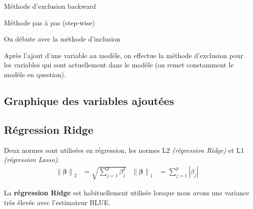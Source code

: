 \documentclass[10pt, french]{article}
\newcommand{\norm}[1]{\left\lVert#1\right\rVert}
\begin{document}
\begin{multicols*}{3}
\begin{enumerate}
\begin{algo}{Méthode d'exclusion backward}
\end{algo}
\end{enumerate}

\begin{enumerate}
\begin{algo}{Méthode pas à pas (step-wise)}

\item On débute avec la méthode d'inclusion
\item Après l'ajout d'une variable au modèle, on effectue la méthode d'exclusion pour les variables qui sont actuellement dans le modèle (on remet constamment le modèle en question).
\end{algo}
\end{enumerate}

%

\subsection*{Graphique des variables ajoutées}



\subsection*{Régression Ridge}

Deux normes sont utilisées en régression, les normes L2 \textit{(régression Ridge)} et L1 \textit{(régression Lasso)}. 
\begin{align*}
\norm{\bm{\beta}}_2 &= \sqrt{\sum_{j = 1}^{p} \beta_{j}^{2}} &
\norm{\bm{\beta}}_1 &= \sum_{j = 1}^{p} \left|\beta_{j} \right|
\end{align*}

La \textbf{régression Ridge} est habituellement utilisée lorsque nous avons une variance très élevée avec l'estimateur BLUE.


\end{multicols*}
\end{document}
